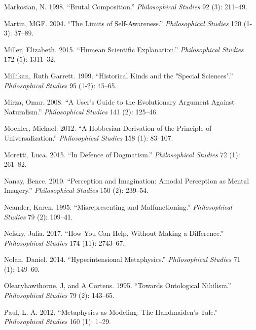 \documentclass[
  10pt,
  letterpaper,
  DIV=11,
  numbers=noendperiod,
  twoside]{scrartcl}
\newlength{\cslhangindent}
\newenvironment{CSLReferences}[2] %
 {\begin{list}{}{%
  \setlength{\itemindent}{0pt}
  \setlength{\leftmargin}{0pt}
  \setlength{\parsep}{0pt}
  \ifodd #1
   \setlength{\leftmargin}{\cslhangindent}
   \setlength{\itemindent}{-1\cslhangindent}
  \fi
  \setlength{\itemsep}{#2\baselineskip}}}
 {\end{list}}
\begin{document}
\begin{CSLReferences}{1}{0}
Markosian, N. 1998. {``Brutal Composition.''} \emph{Philosophical
Studies} 92 (3): 211--49.

Martin, MGF. 2004. {``The Limits of Self-Awareness.''}
\emph{Philosophical Studies} 120 (1-3): 37--89.

Miller, Elizabeth. 2015. {``Humean Scientific Explanation.''}
\emph{Philosophical Studies} 172 (5): 1311--32.

Millikan, Ruth Garrett. 1999. {``Historical Kinds and the "Special
Sciences".''} \emph{Philosophical Studies} 95 (1-2): 45--65.

Mirza, Omar. 2008. {``A User's Guide to the Evolutionary Argument
Against Naturalism.''} \emph{Philosophical Studies} 141 (2): 125--46.

Moehler, Michael. 2012. {``A Hobbesian Derivation of the Principle of
Universalization.''} \emph{Philosophical Studies} 158 (1): 83--107.

Moretti, Luca. 2015. {``In Defence of Dogmatism.''} \emph{Philosophical
Studies} 72 (1): 261--82.

Nanay, Bence. 2010. {``Perception and Imagination: Amodal Perception as
Mental Imagery.''} \emph{Philosophical Studies} 150 (2): 239--54.

Neander, Karen. 1995. {``Misrepresenting and Malfunctioning.''}
\emph{Philosophical Studies} 79 (2): 109--41.

Nefsky, Julia. 2017. {``How You Can Help, Without Making a
Difference.''} \emph{Philosophical Studies} 174 (11): 2743--67.

Nolan, Daniel. 2014. {``Hyperintensional Metaphysics.''}
\emph{Philosophical Studies} 71 (1): 149--60.

Olearyhawthorne, J, and A Cortens. 1995. {``Towards Ontological
Nihilism.''} \emph{Philosophical Studies} 79 (2): 143--65.

Paul, L. A. 2012. {``Metaphysics as Modeling: The Handmaiden's Tale.''}
\emph{Philosophical Studies} 160 (1): 1--29.


\end{CSLReferences}
\end{document}
